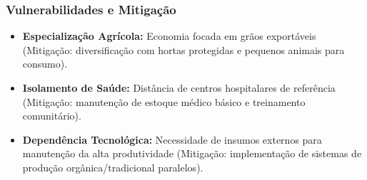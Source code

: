 \subsubsection{Vulnerabilidades e
Mitigação}

\begin{itemize}
\tightlist
\item
  \textbf{Especialização Agrícola:} Economia focada em grãos exportáveis
  (Mitigação: diversificação com hortas protegidas e pequenos animais
  para consumo).
\item
  \textbf{Isolamento de Saúde:} Distância de centros hospitalares de
  referência (Mitigação: manutenção de estoque médico básico e
  treinamento comunitário).
\item
  \textbf{Dependência Tecnológica:} Necessidade de insumos externos para
  manutenção da alta produtividade (Mitigação: implementação de sistemas
  de produção orgânica/\allowbreak tradicional paralelos).
\end{itemize}

